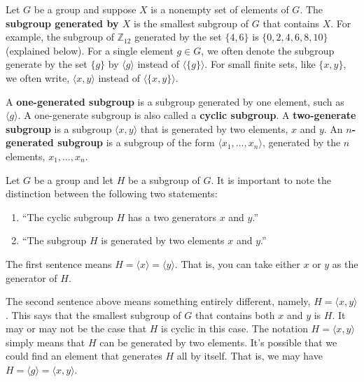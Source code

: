 \documentclass[12pt]{article}
\newcommand{\Z} {{\mathbb Z}}
\newcommand{\<}{\ensuremath{\langle}}
\renewcommand{\>}{\ensuremath{\rangle}}
\theoremstyle{plain}
\theoremstyle{definition}
\begin{document}
Let $G$ be a group and suppose $X$ is a nonempty set of elements of $G$.
The {\bf subgroup generated by $X$} is the smallest subgroup of $G$ that
contains $X$.  
For example, the subgroup of $\Z_{12}$ generated by the set $\{4, 6\}$ is 
$\{0, 2, 4, 6, 8, 10\}$ (explained below).
For a single element $g \in G$, we often denote the subgroup generate
by the set $\{g\}$ by $\<g\>$ instead of $\<\{g\}\>$.  
For small finite sets, like $\{x, y\}$, we often write, 
$\<x, y\>$ instead of $\<\{x, y\}\>$.

A {\bf one-generated subgroup} is a subgroup generated by one
element, such as $\<g\>$.  A one-generate subgroup is also called a {\bf cyclic
subgroup}.  A {\bf two-generate subgroup} is a
subgroup $\<x, y\>$ that is generated by two elements, $x$ and $y$.
An {\bf $n$-generated subgroup} is a
subgroup of the form $\<x_1, \dots, x_n\>$, generated by the $n$ elements,
$x_1, \dots, x_n$.

Let $G$ be a group and let $H$ be a subgroup of $G$.
It is important to note the distinction between the following two statements:
\begin{enumerate}
\item ``The cyclic subgroup $H$ has a two generators $x$ and $y$.''
\item ``The subgroup $H$ is generated by two elements $x$ and $y$.''
\end{enumerate}
The first sentence means $H = \<x\> = \<y\>$.  That is, you can take either $x$
or $y$ as the generator of $H$.  

The second sentence above means something entirely
different, namely, $H = \<x, y\>$.  This says that the smallest subgroup of $G$
that contains both $x$ and $y$ is $H$.  It may or may not be the case that $H$
is cyclic in this case.  The notation $H = \<x, y\>$ simply means that $H$ can
be generated by two elements.  It's possible that we could find
an element that generates $H$ all by itself.  That is, we
may have $H = \<g\> = \<x, y\>$.  

\bigskip
\end{document}
